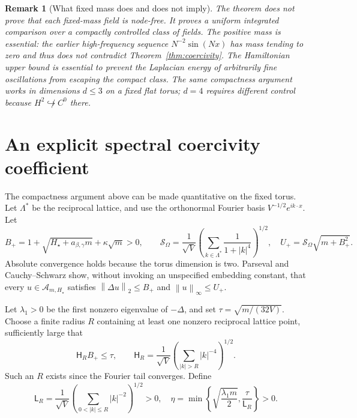 \documentclass[11pt]{article}
\newtheorem{remark}[theorem]{Remark}
\newcommand{\norm}[1]{\left\|#1\right\|}
\begin{document}
\begin{remark}[What fixed mass does and does not imply]
The theorem does \emph{not} prove that each fixed-mass field is node-free.
It proves a uniform \emph{integrated} comparison over a compactly controlled
class of fields. The positive mass is essential: the earlier high-frequency
sequence \(N^{-2}\sin(Nx)\) has mass tending to zero and thus does not
contradict Theorem~\ref{thm:coercivity}. The Hamiltonian upper bound is
essential to prevent the Laplacian energy of arbitrarily fine oscillations
from escaping the compact class. The same compactness argument works
in dimensions \(d\leq3\) on a fixed flat torus; \(d=4\) requires
different control because \(H^2\not\hookrightarrow C^0\) there.
\end{remark}


\section{An explicit spectral coercivity coefficient}
\label{sec:explicit}
The compactness argument above can be made quantitative on the
fixed torus. Let \(\Lambda^\ast\) be the reciprocal lattice, and use
the orthonormal Fourier basis \(V^{-1/2}e^{ik\cdot x}\).
Let
\[
B_+=1+\sqrt{H_\star+a_{\beta,\gamma}m}+\kappa\sqrt m>0,\qquad
\mathcal S_\Omega=\frac1{\sqrt V}
\left(\sum_{k\in\Lambda^\ast}\frac{1}{1+|k|^4}\right)^{1/2},
\quad
U_+=\mathcal S_\Omega\sqrt{m+B_+^2}.
\]
Absolute convergence holds because the torus dimension is two.
Parseval and Cauchy--Schwarz show, without invoking an unspecified
embedding constant, that every \(u\in\mathcal A_{m,H_\star}\)
satisfies
\(\norm{\Delta u}_2\le B_+\) and \(\norm{u}_\infty\le U_+\).

Let \(\lambda_1>0\) be the first nonzero eigenvalue of
\(-\Delta\), and set \(\tau=\sqrt{m/(32V)}\).
Choose a finite radius \(R\) containing at least one nonzero reciprocal
lattice point, sufficiently large that
\[
\mathsf H_R B_+\le\tau,\qquad
\mathsf H_R=\frac1{\sqrt V}
\left(\sum_{|k|>R}|k|^{-4}\right)^{1/2}.
\]
Such an \(R\) exists since the Fourier tail converges.
Define
\[
\mathsf L_R=\frac1{\sqrt V}
\left(\sum_{0<|k|\le R}|k|^{-2}\right)^{1/2}>0,
\quad
\eta=\min\left\{\sqrt{\frac{\lambda_1 m}{2}},
\frac{\tau}{\mathsf L_R}\right\}>0.
\]
\end{document}

